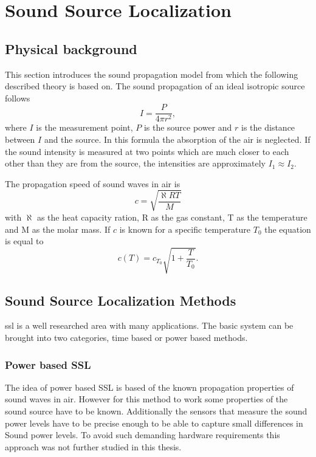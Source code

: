 \graphicspath{ {images/3_source_localization/} }
\chapter{Sound Source Localization}
\section{Physical background}
This section introduces the sound propagation model from \cite{physik_skript} which the following described theory is based on.
The sound propagation of an ideal isotropic source follows
\begin{equation}
	I = \frac{P}{4\pi r^2},
\end{equation}
where $I$ is the measurement point, $P$ is the source power and $r$ is the distance
between $I$ and the source.
In this formula the absorption of the air is neglected.
If the sound intensity is measured at two points which are much closer
to each other than they are from the source, the intensities are approximately
$I_1 \approx I_2$.

The propagation speed of sound waves in air is 
\begin{equation}
	c = \sqrt{\frac{\aleph R T}{M}}
\end{equation}
with $\aleph$ as the heat capacity ration, R as the gas constant, T as the temperature
and M as the molar mass.
If $c$ is known for a specific temperature $T_0$ the equation is equal to 
\begin{equation}
	c(T) = c_{T_0} \sqrt{1 + \frac{T}{T_0}}.
\end{equation}


\section{Sound Source Localization Methods}
\acrfull{ssl} is a well researched area with many applications.
The basic system can be brought into two categories, time based or power based methods.
\subsection{Power based SSL}
The idea of power based SSL is based of the known propagation properties of sound waves in air.
However for this method to work some properties of the sound source have to be known.
Additionally the sensors that measure the sound power levels have to be precise
enough to be able to capture small differences in Sound power levels.
To avoid such demanding hardware requirements this approach was not further 
studied in this thesis.


